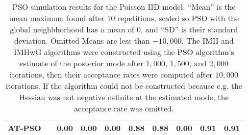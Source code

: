 \documentclass[12pt]{article}
\begin{document}
\begin{table}[h]
{\begin{tabular}{llrr|rrr|rrr}
  AT-PSO &  & 0.00 & 0.00 & 0.00 & 0.88 & 0.88 & 0.00 & 0.91 & 0.91 \\ 
   \hline
\end{tabular}
}
\label{tab:psopoisiid}
\caption{PSO simulation results for the Poisson IID model. ``Mean'' is the mean maximum found after 10 repetitions, scaled so PSO with the global neighbhorhood has a mean of 0, and ``SD'' is their standard deviation. Omitted Means are less than $-10,000$. The IMH and IMHwG algorithms were constructed using the PSO algorithm's estimate of the posterior mode after $1,000$, $1,500$, and $2,000$ iterations, then their acceptance rates were computed after $10,000$ iterations. If the algorithm could not be constructed because e.g. the Hessian was not negative definite at the estimated mode, the acceptance rate was omitted.}
\end{table}
\end{document}
